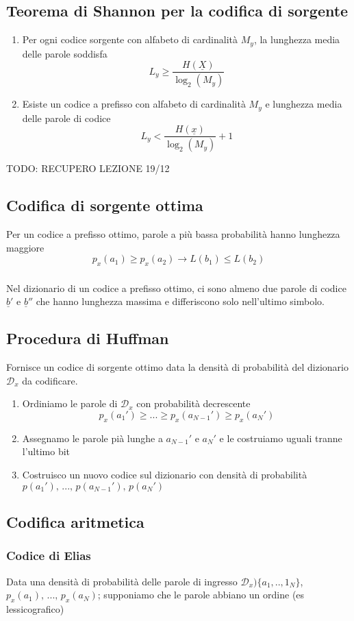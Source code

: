 \documentclass{article}
\begin{document}
\subsection{Teorema di Shannon per la codifica di sorgente}
\begin{enumerate}
	\item Per ogni codice sorgente con alfabeto di cardinalità $M_y$, la lunghezza media delle parole soddisfa $$L_y\geq \frac{H(\underline{X})}{\log_2(M_y)}$$
	\item Esiste un codice a prefisso con alfabeto di cardinalità $M_y$ e lunghezza media delle parole di codice $$L_y<\frac{H(\underline{x})}{\log_2(M_y)}+1$$
\end{enumerate}
TODO: RECUPERO LEZIONE 19/12

\subsection{Codifica di sorgente ottima}
Per un codice a prefisso ottimo, parole a più bassa probabilità hanno lunghezza maggiore $$p_x(a_1)\geq p_x(a_2)\rightarrow L(b_1)\leq L(b_2)$$
\subsubsection{}
Nel dizionario di un codice a prefisso ottimo, ci sono almeno due parole di codice $\underline{b}'$ e $\underline{b}''$ che hanno lunghezza massima e differiscono solo nell'ultimo simbolo.\\

\subsection{Procedura di Huffman}
Fornisce un codice di sorgente ottimo data la densità di probabilità del dizionario $\mathcal{D}_x$ da codificare.
\begin{enumerate}
	\item Ordiniamo le parole di $\mathcal{D}_x$ con probabilità decrescente $$p_x(a_1')\geq...\geq p_x(a_{N-1}')\geq p_x(a_N')$$
	\item Assegnamo le parole pià lunghe a $a_{N-1}'$ e $a_N'$ e le costruiamo uguali tranne l'ultimo bit
	\item Costruisco un nuovo codice sul dizionario con densità di probabilità\\ $p(a_1'),\,...,\,p(a_{N-1}'),\,p(a_N')$
\end{enumerate}

\subsection{Codifica aritmetica}

\subsubsection{Codice di Elias}
Data una densità di probabilità delle parole di ingresso $\mathcal{D}_x)\{a_1,..,1_N\}$, $p_x(a_1),\,...,\,p_x(a_N)$; supponiamo che le parole abbiano un ordine (es lessicografico)
\end{document}
